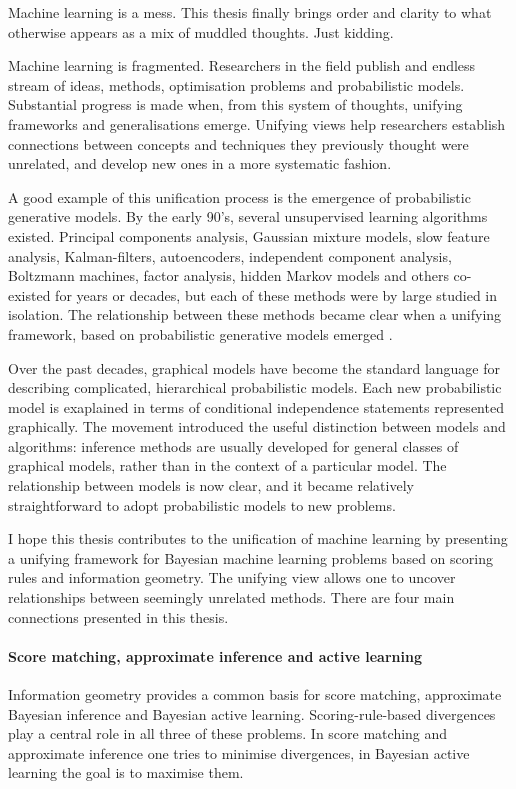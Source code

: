 
Machine learning is a mess. This thesis finally brings order and clarity to what otherwise appears as a mix of muddled thoughts. Just kidding.

Machine learning is fragmented. Researchers in the field publish and endless stream of ideas, methods, optimisation problems and probabilistic models. Substantial progress is made when, from this system of thoughts, unifying frameworks and generalisations emerge. Unifying views help researchers establish connections between concepts and techniques they previously thought were unrelated, and develop new ones in a more systematic fashion.

A good example of this unification process is the emergence of probabilistic generative models. By the early 90's, several unsupervised learning algorithms existed. Principal components analysis, Gaussian mixture models, slow feature analysis, Kalman-filters, autoencoders, independent component analysis, Boltzmann machines, factor analysis, hidden Markov models and others co-existed for years or decades, but each of these methods were by large studied in isolation. The relationship between these methods became clear when a unifying framework, based on probabilistic generative models emerged \citep{Lauritzen1996,Roweis1999,Tipping1999,Turner2007}.

Over the past decades, graphical models \citep{Lauritzen1996} have become the standard language for describing complicated, hierarchical probabilistic models. Each new probabilistic model is exaplained in terms of conditional independence statements represented graphically. The movement introduced the useful distinction between models and algorithms: inference methods are usually developed for general classes of graphical models, rather than in the context of a particular model. The relationship between models is now clear, and it became relatively straightforward to adopt probabilistic models to new problems.

I hope this thesis contributes to the unification of machine learning by presenting a unifying framework for Bayesian machine learning problems based on scoring rules and information geometry. The unifying view allows one to uncover relationships between seemingly unrelated methods. There are four main connections presented in this thesis.

\paragraph{Score matching, approximate inference and active learning} Information geometry provides a common basis for score matching, approximate Bayesian inference and Bayesian active learning. Scoring-rule-based divergences play a central role in all three of these problems. In score matching and approximate inference one tries to minimise divergences, in Bayesian active learning the goal is to maximise them.

